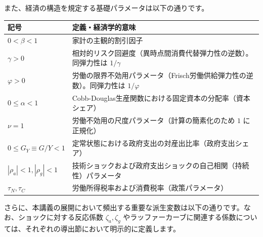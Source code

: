 \documentclass[
  japanese,
  lualatex,
  ja=standard,
  12pt,
  a4paper]{ltjsarticle}
\newcounter{none} %
\begin{document}
また、経済の構造を規定する基礎パラメータは以下の通りです。

{\def\LTcaptype{none} %
\begin{longtable}[]{@{}
  >{\raggedright\arraybackslash}p{}
  >{\raggedright\arraybackslash}p{}@{}}
\toprule\noalign{}
\begin{minipage}[b]{\linewidth}\raggedright
記号
\end{minipage} & \begin{minipage}[b]{\linewidth}\raggedright
定義・経済学的意味
\end{minipage} \\
\midrule\noalign{}
\endhead
\bottomrule\noalign{}
\endlastfoot
\(0 < \beta < 1\) & 家計の主観的割引因子 \\
\(\gamma > 0\) &
相対的リスク回避度（異時点間消費代替弾力性の逆数）。同弾力性は
\(1/\gamma\) \\
\(\varphi > 0\) &
労働の限界不効用パラメータ（Frisch労働供給弾力性の逆数）。同弾力性は
\(1/\varphi\) \\
\(0 \leq \alpha < 1\) &
Cobb-Douglas生産関数における固定資本の分配率（資本シェア） \\
\(\nu = 1\) & 労働不効用の尺度パラメータ（計算の簡素化のため \(1\)
に正規化） \\
\(0 \leq G_Y \equiv G/Y < 1\) &
定常状態における政府支出の対産出比率（政府支出シェア） \\
\(|\rho_a| < 1, |\rho_g| < 1\) &
技術ショックおよび政府支出ショックの自己相関（持続性）パラメータ \\
\(\tau_N, \tau_C\) & 労働所得税率および消費税率（政策パラメータ） \\
\end{longtable}
}

さらに、本講義の展開において頻出する重要な派生変数は以下の通りです。なお、ショックに対する反応係数
\(\zeta_a, \zeta_g\)
やラッファーカーブに関連する係数については、それぞれの導出節において明示的に定義します。
\end{document}
